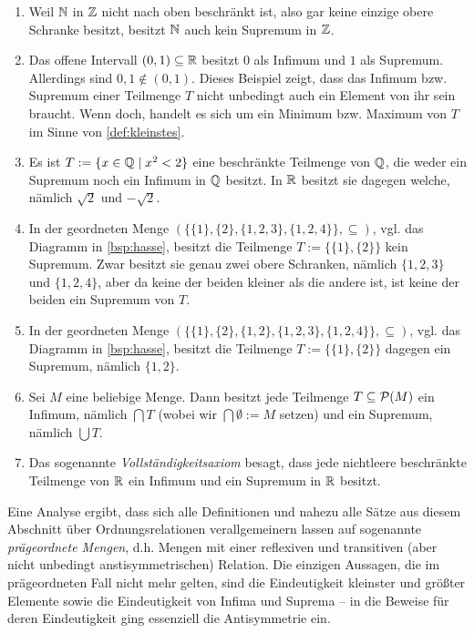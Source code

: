 \begin{bsp} \quad
    \begin{enumerate}
        \item Weil $\mathbb N$ in $\mathbb Z$ nicht nach oben beschränkt ist, also gar keine einzige obere Schranke besitzt, besitzt $\mathbb N$ auch kein Supremum in $\mathbb Z$.
        \item Das offene Intervall $(0,1)\subseteq \mathbb R$ besitzt $0$ als Infimum und $1$ als Supremum. Allerdings sind $0,1\notin (0,1)$. Dieses Beispiel zeigt, dass das Infimum bzw. Supremum einer Teilmenge $T$ nicht unbedingt auch ein Element von ihr sein braucht. Wenn doch, handelt es sich um ein Minimum bzw. Maximum von $T$ im Sinne von \cref{def:kleinstes}.
        \item Es ist $T:=\{x\in \mathbb Q \mid x^2 < 2\}$ eine beschränkte Teilmenge von $\mathbb Q$, die weder ein Supremum noch ein Infimum in $\mathbb Q$ besitzt. In $\mathbb R$ besitzt sie dagegen welche, nämlich $\sqrt{2}$ und $-\sqrt{2}$.
        \item In der geordneten Menge $(\{\{1\},\{2\},\{1,2,3\},\{1,2,4\}\},\subseteq)$, vgl. das Diagramm in \cref{bsp:hasse}, besitzt die Teilmenge $T:=\{\{1\},\{2\}\}$ kein Supremum. Zwar besitzt sie genau zwei obere Schranken, nämlich $\{1,2,3\}$ und $\{1,2,4\}$, aber da keine der beiden kleiner als die andere ist, ist keine der beiden ein Supremum von $T$.
        \item In der geordneten Menge $(\{\{1\},\{2\},\{1,2\},\{1,2,3\},\{1,2,4\}\},\subseteq)$, vgl. das Diagramm in \cref{bsp:hasse}, besitzt die Teilmenge $T:=\{\{1\},\{2\}\}$ dagegen ein Supremum, nämlich $\{1,2\}$.
        \item Sei $M$ eine beliebige Menge. Dann besitzt jede Teilmenge $T\subseteq \mathcal P(M)$ ein Infimum, nämlich $\bigcap T$ (wobei wir $\bigcap \emptyset:=M$ setzen) und ein Supremum, nämlich $\bigcup T$.
        \item Das sogenannte \emph{Vollständigkeitsaxiom} besagt, dass jede nichtleere beschränkte Teilmenge von $\mathbb R$ ein Infimum und ein Supremum in $\mathbb R$ besitzt.
    \end{enumerate}
\end{bsp}


\begin{bem}
    Eine Analyse ergibt, dass sich alle Definitionen und nahezu alle Sätze aus diesem Abschnitt über Ordnungsrelationen verallgemeinern lassen auf sogenannte \emph{prägeordnete Mengen}, d.h. Mengen mit einer reflexiven und transitiven (aber nicht unbedingt anstisymmetrischen) Relation. Die einzigen Aussagen, die im prägeordneten Fall nicht mehr gelten, sind die Eindeutigkeit kleinster und größter Elemente sowie die Eindeutigkeit von Infima und Suprema -- in die Beweise für deren Eindeutigkeit ging essenziell die Antisymmetrie ein.
\end{bem}


